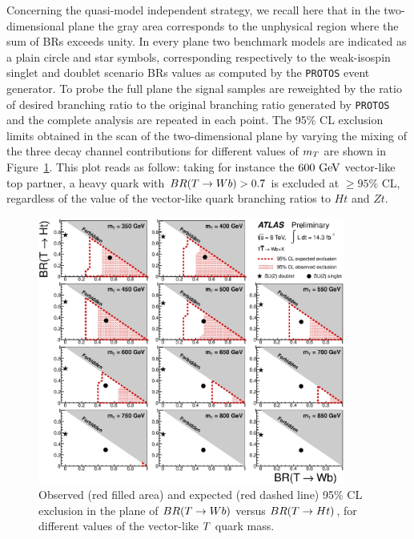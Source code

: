 Concerning the quasi-model independent strategy, 
we recall here that in the two-dimensional plane the gray area
corresponds to the unphysical region where the sum of BRs
exceeds unity. In every plane two benchmark models are indicated
as a plain circle and star symbols, corresponding respectively to the
weak-isospin singlet and doublet scenario BRs values as computed by the
\texttt{PROTOS} event generator.
To probe the full plane the signal samples are reweighted by the ratio
of desired branching ratio to the original branching ratio generated
by \texttt{PROTOS} and the complete analysis are repeated in each point.
The  95\% CL exclusion limits  obtained in the scan of the two-dimensional
plane by varying the mixing of the three decay channel contributions for
different values of $m_{\T}$ are shown in Figure~\ref{fig:limits2D_wbx}. 
This plot reads as follow: taking for instance the $600\gev$ 
vector-like top partner, a heavy quark with
$BR(\T\to W b)>0.7$ is excluded at $\geq 95\%$ CL, 
regardless of the value of the vector-like quark branching ratios to $Ht$ and $Zt$.  


\begin{figure}[h!bt]
\begin{center}
\includegraphics[width=0.9\textwidth]{results/figures/NewttbarMod/lim_Scan2D_tight_Bin1.eps}
\caption{
Observed (red filled area) and expected (red dashed line) 95\% CL exclusion in the plane of
$BR(\T \to Wb)$ versus $BR(\T \to Ht)$, for different values of the vector-like $\T$ quark mass.
\label{fig:limits2D_wbx}}
\end{center}
\end{figure}













